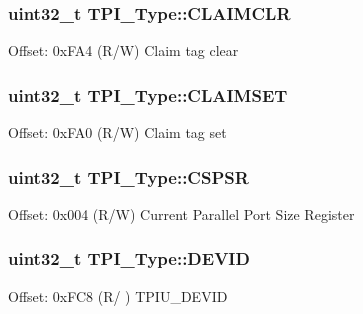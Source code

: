 \subsubsection[{\texorpdfstring{C\+L\+A\+I\+M\+C\+LR}{CLAIMCLR}}]{ uint32\+\_\+t T\+P\+I\+\_\+\+Type\+::\+C\+L\+A\+I\+M\+C\+LR}\hypertarget{struct_t_p_i___type_a44efa6045512c8d4da64b0623f7a43ad}{}\label{struct_t_p_i___type_a44efa6045512c8d4da64b0623f7a43ad}
Offset\+: 0x\+F\+A4 (R/W) Claim tag clear 
\subsubsection[{\texorpdfstring{C\+L\+A\+I\+M\+S\+ET}{CLAIMSET}}]{ uint32\+\_\+t T\+P\+I\+\_\+\+Type\+::\+C\+L\+A\+I\+M\+S\+ET}\hypertarget{struct_t_p_i___type_a2e4d5a07fabd771fa942a171230a0a84}{}\label{struct_t_p_i___type_a2e4d5a07fabd771fa942a171230a0a84}
Offset\+: 0x\+F\+A0 (R/W) Claim tag set 
\subsubsection[{\texorpdfstring{C\+S\+P\+SR}{CSPSR}}]{ uint32\+\_\+t T\+P\+I\+\_\+\+Type\+::\+C\+S\+P\+SR}\hypertarget{struct_t_p_i___type_aa723ef3d38237aa2465779b3cc73a94a}{}\label{struct_t_p_i___type_aa723ef3d38237aa2465779b3cc73a94a}
Offset\+: 0x004 (R/W) Current Parallel Port Size Register 
\subsubsection[{\texorpdfstring{D\+E\+V\+ID}{DEVID}}]{ uint32\+\_\+t T\+P\+I\+\_\+\+Type\+::\+D\+E\+V\+ID}\hypertarget{struct_t_p_i___type_a4b2e0d680cf7e26728ca8966363a938d}{}\label{struct_t_p_i___type_a4b2e0d680cf7e26728ca8966363a938d}
Offset\+: 0x\+F\+C8 (R/ ) T\+P\+I\+U\+\_\+\+D\+E\+V\+ID 
